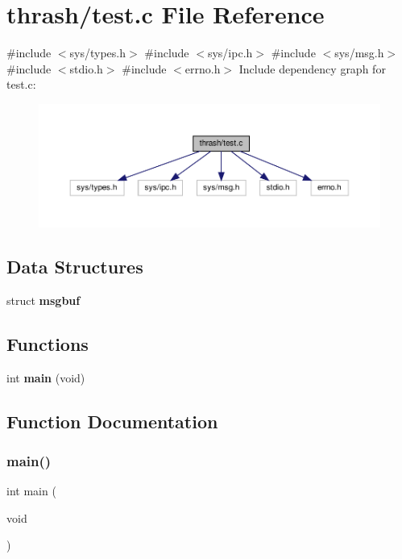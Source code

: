 \section{thrash/test.c File Reference}
\label{test_8c}
{\ttfamily \#include $<$sys/types.\+h$>$}\newline
{\ttfamily \#include $<$sys/ipc.\+h$>$}\newline
{\ttfamily \#include $<$sys/msg.\+h$>$}\newline
{\ttfamily \#include $<$stdio.\+h$>$}\newline
{\ttfamily \#include $<$errno.\+h$>$}\newline
Include dependency graph for test.\+c\+:\nopagebreak
\begin{figure}[H]
\begin{center}
\leavevmode
\includegraphics[width=350pt]{test_8c__incl}
\end{center}
\end{figure}
\subsection*{Data Structures}
\begin{DoxyCompactItemize}
\item 
struct \textbf{ msgbuf}
\end{DoxyCompactItemize}
\subsection*{Functions}
\begin{DoxyCompactItemize}
\item 
int \textbf{ main} (void)
\end{DoxyCompactItemize}


\subsection{Function Documentation}
\mbox{\label{test_8c_a840291bc02cba5474a4cb46a9b9566fe}} 
\subsubsection{main()}
{\footnotesize\ttfamily int main (\begin{DoxyParamCaption}\item[{void}]{ }\end{DoxyParamCaption})}

